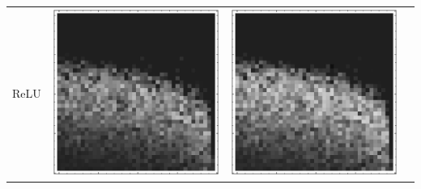 \documentclass[10pt]{article}
\begin{document}
\begin{tabular}{|c|c|c|c|}
ReLU 
        & \includegraphics[scale=0.25]{plots/simple/LF-20R10R-20T10-CIFAR-1.eps}
        & \includegraphics[scale=0.25]{plots/simple/LF-20R10R-20T10-CIFAR-2.eps}

\end{tabular}
\end{document}
